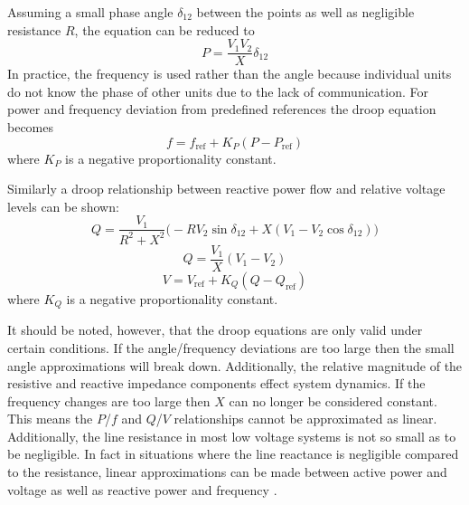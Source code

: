 Assuming a small phase angle $\delta_{12}$ between the points as well as negligible resistance $R$, the equation can be reduced to 
\begin{equation}
P = \frac{V_1V_2}{X}\delta_{12}
\end{equation}
In practice, the frequency is used rather than the angle because individual units do not know the phase of other units due to the lack of communication. For power and frequency deviation from predefined references the droop equation becomes
\begin{equation}
f = f_{\text{ref}} + K_P\left(P - P_{\text{ref}}\right)
\end{equation}
where $K_P$ is a negative proportionality constant. 



Similarly a droop relationship between reactive power flow and relative voltage levels can be shown:
\begin{equation}
Q = \frac{V_1}{R^2 + X^2} \big( -R V_2 \sin{\delta_{12}} + X \left(V_1 - V_2 \cos{\delta_{12}}\right) \big)
\end{equation}
\begin{equation}
Q = \frac{V_1}{X} \left( V_1 - V_2 \right)
\end{equation}
\begin{equation}
V = V_{\text{ref}} + K_Q \left( Q - Q_{\text{ref}} \right)
\end{equation}
where $K_Q$ is a negative proportionality constant. 

It should be noted, however, that the droop equations are only valid under certain conditions. If the angle\slash frequency deviations are too large then the small angle approximations will break down. Additionally, the relative magnitude of the resistive and reactive impedance components effect system dynamics. If the frequency changes are too large then $X$ can no longer be considered constant. This means the $P$\slash $f$ and $Q$\slash $V$ relationships cannot be approximated as linear. Additionally, the line resistance in most low voltage systems is not so small as to be negligible. In fact in situations where the line reactance is negligible compared to the resistance, linear approximations can be made between active power and voltage as well as reactive power and frequency \cite{YunWeiLi2009}.


